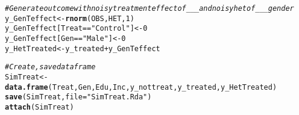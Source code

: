 \documentclass[11pt, a4paper]{article}\usepackage[]{graphicx}\usepackage[]{color}
\makeatletter
\newcommand{\hlnum}[1]{\textcolor[rgb]{0.686,0.059,0.569}{#1}}%
\newcommand{\hlstr}[1]{\textcolor[rgb]{0.192,0.494,0.8}{#1}}%
\newcommand{\hlcom}[1]{\textcolor[rgb]{0.678,0.584,0.686}{\textit{#1}}}%
\newcommand{\hlopt}[1]{\textcolor[rgb]{0,0,0}{#1}}%
\newcommand{\hlstd}[1]{\textcolor[rgb]{0.345,0.345,0.345}{#1}}%
\newcommand{\hlkwb}[1]{\textcolor[rgb]{0.69,0.353,0.396}{#1}}%
\newcommand{\hlkwc}[1]{\textcolor[rgb]{0.333,0.667,0.333}{#1}}%
\newcommand{\hlkwd}[1]{\textcolor[rgb]{0.737,0.353,0.396}{\textbf{#1}}}%
\newenvironment{kframe}{%
 \def\at@end@of@kframe{}%
 \ifinner\ifhmode%
  \def\at@end@of@kframe{\end{minipage}}%
  \begin{minipage}{\columnwidth}%
 \fi\fi%
 \def\FrameCommand##1{\hskip\@totalleftmargin \hskip-\fboxsep
 \colorbox{shadecolor}{##1}\hskip-\fboxsep
     \hskip-\linewidth \hskip-\@totalleftmargin \hskip\columnwidth}%
 \MakeFramed {\advance\hsize-\width
   \@totalleftmargin\z@ \linewidth\hsize
   \@setminipage}}%
 {\par\unskip\endMakeFramed%
 \at@end@of@kframe}
\newenvironment{knitrout}{}{} %
\makeatother
\begin{document}
\begin{knitrout}
\begin{kframe}
\begin{alltt}
  \hlcom{#Generate outcome with noisy treatment effect of ___ and noisy het of ___ gender}
    \hlstd{y_GenTeffect} \hlkwb{<-} \hlkwd{rnorm}\hlstd{(OBS, HET,} \hlnum{1}\hlstd{)}
    \hlstd{y_GenTeffect[Treat} \hlopt{==} \hlstr{"Control"}\hlstd{]} \hlkwb{<-} \hlnum{0}
    \hlstd{y_GenTeffect[Gen} \hlopt{==} \hlstr{"Male"}\hlstd{]} \hlkwb{<-} \hlnum{0}
    \hlstd{y_HetTreated} \hlkwb{<-} \hlstd{y_treated} \hlopt{+} \hlstd{y_GenTeffect}

  \hlcom{#Create, save dataframe}
    \hlstd{SimTreat} \hlkwb{<-} \hlkwd{data.frame}\hlstd{(Treat, Gen, Edu, Inc, y_nottreat, y_treated, y_HetTreated)}
    \hlkwd{save}\hlstd{(SimTreat,}\hlkwc{file} \hlstd{=} \hlstr{"SimTreat.Rda"}\hlstd{)}
    \hlkwd{attach}\hlstd{(SimTreat)}
\end{alltt}


{\ttfamily\noindent\itshape\color{messagecolor}{\#\# The following objects are masked \_by\_ .GlobalEnv:\\\#\# \\\#\#\ \ \ \  Edu, Gen, Inc, Treat, y\_HetTreated, y\_nottreat, y\_treated}}\end{kframe}
\end{knitrout}
\end{document}
